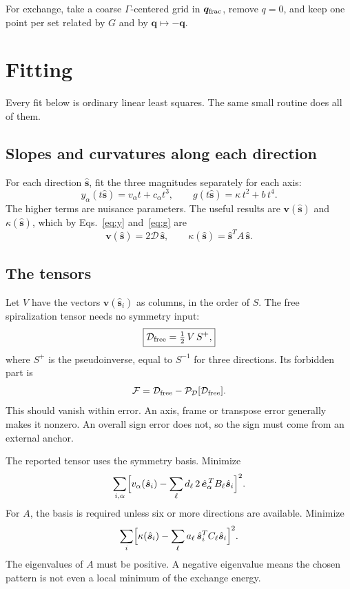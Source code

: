 \documentclass[11pt,a4paper]{article}
\numberwithin{equation}{section}
\newcommand{\vct}[1]{\bm{#1}}
\newcommand{\qh}{\vct q}
\newcommand{\sh}{\hat{\vct s}}
\newcommand{\Dt}{\mathcal D}
\newcommand{\Pj}{\mathcal P}
\begin{document}
For exchange, take a coarse $\Gamma$-centered grid in $\qh_{\rm frac}$, remove
$q=0$, and keep one point per set related by $G$ and by $\qh\mapsto-\qh$.

\section{Fitting}\label{sec:fit}

Every fit below is ordinary linear least squares. The same small routine does
all of them.

\subsection{Slopes and curvatures along each direction}

For each direction $\sh$, fit the three magnitudes separately for each axis:
\begin{equation}\label{eq:slopes}
 y_\alpha(t\sh)=v_\alpha t+c_\alpha t^3,\qquad
 g(t\sh)=\kappa\,t^2+b\,t^4.
\end{equation}
The higher terms are nuisance parameters. The useful results are $\vct v(\sh)$
and $\kappa(\sh)$, which by Eqs.~\eqref{eq:y} and~\eqref{eq:g} are
\begin{equation}\label{eq:vkappa}
 \vct v(\sh)=2\Dt\,\sh,\qquad \kappa(\sh)=\sh^{T}A\,\sh.
\end{equation}

\subsection{The tensors}

Let $V$ have the vectors $\vct v(\sh_i)$ as columns, in the order of $S$. The
free spiralization tensor needs no symmetry input:
\begin{equation}\label{eq:free}
 \boxed{\Dt_{\rm free}=\tfrac12\,V\,S^{+},}
\end{equation}
where $S^{+}$ is the pseudoinverse, equal to $S^{-1}$ for three directions.
Its forbidden part is
\begin{equation}\label{eq:forbidden}
 \mathcal F=\Dt_{\rm free}-\Pj_{\Dt}[\Dt_{\rm free}].
\end{equation}
This should vanish within error. An axis, frame or transpose error generally
makes it nonzero. An overall sign error does not, so the sign must come from an
external anchor.

The reported tensor uses the symmetry basis. Minimize
\begin{equation}\label{eq:dfit}
 \sum_{i,\alpha}\Bigl[v_\alpha(\sh_i)-\sum_\ell d_\ell\,
 2\,\hat{\vct e}_\alpha^{\,T}B_\ell\sh_i\Bigr]^2.
\end{equation}
For $A$, the basis is required unless six or more directions are available. Minimize
\begin{equation}\label{eq:afit}
 \sum_i\Bigl[\kappa(\sh_i)-\sum_\ell a_\ell\,\sh_i^{T}C_\ell\sh_i\Bigr]^2.
\end{equation}
The eigenvalues of $A$ must be positive. A negative eigenvalue means the chosen
pattern is not even a local minimum of the exchange energy.
\end{document}
